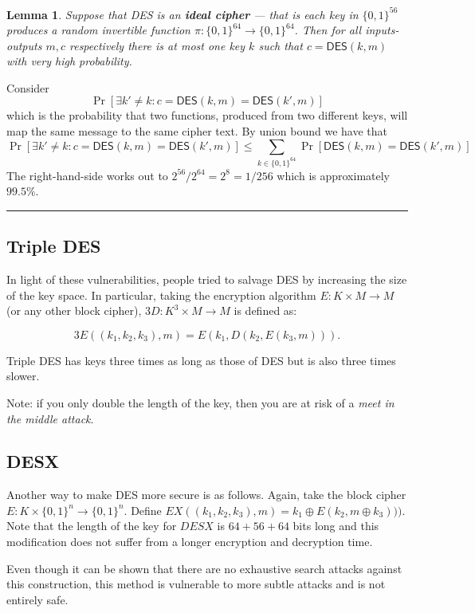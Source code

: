 \documentclass[twoside]{article}
\newtheorem{lemma}[theorem]{Lemma}
\newenvironment{proof}{{\bf Proof:}}{\hfill\rule{2mm}{2mm}}
\def\DES{\mathsf{DES}}
\begin{document}
\begin{lemma}
Suppose that DES is an \textbf{ideal cipher} --- that is each key in $\{0,1\}^{56}$ produces a random invertible function $\pi: \{0,1\}^{64} \rightarrow \{0,1\}^{64}$. Then for all inputs-outputs $m, c$ respectively there is at most one key $k$ such that $c = \DES(k,m)$ with \emph{very} high probability.
\end{lemma}
\begin{proof}
Consider
\[\Pr[\exists k' \neq k: c = \DES(k, m) = \DES(k', m)]\]
which is the probability that two functions, produced from two different keys, will map the same message to the same cipher text. By union bound we have that
\[\Pr[\exists k' \neq k: c = \DES(k, m) = \DES(k', m)]\leq \sum_{k \in \{0,1\}^{64}} \Pr[\DES(k,m) = \DES(k', m)]\]
The right-hand-side works out to $2^{56}/2^{64} = 2^{8} = 1/256$ which is approximately $99.5 \%$.  
\end{proof}

\subsection{Triple DES}
In light of these vulnerabilities, people tried to salvage DES by increasing the size of the key space. In particular, taking the encryption algorithm $E: K \times M \rightarrow M$ (or any other block cipher), $3D: K^3 \times M \rightarrow M$ is defined as:

\[3E((k_1, k_2, k_3), m) = E(k_1, D(k_2, E(k_3, m))).\]

Triple DES has keys three times as long as those of DES but is also three times slower. 

Note: if you only double the length of the key, then you are at risk of a \emph{meet in the middle attack}. 

\subsection{DESX}
Another way to make DES more secure is as follows. Again, take the block cipher $E: K \times \{0,1\}^n \rightarrow \{0,1\}^n$. Define $EX((k_1, k_2, k_3), m) = k_1 \oplus E(k_2, m\oplus k_3)))$. Note that the length of the key for $DESX$ is $64 + 56 + 64$ bits long and this modification does not suffer from a longer encryption and decryption time.

Even though it can be shown that there are no exhaustive search attacks against this construction, this method is vulnerable to more subtle attacks and is not entirely safe. 
\end{document}
